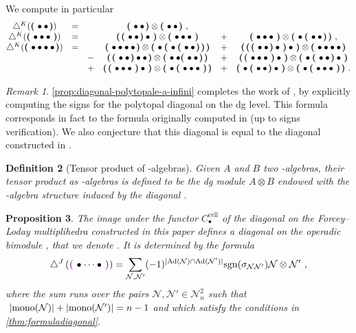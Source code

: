 \documentclass[twoside, 11pt]{amsart}
\newtheorem{definition}{Definition}[section]
\newtheorem{proposition}[definition]{Proposition}
\theoremstyle{remark}
\newtheorem{remark}[definition]{\sc Remark}
\begin{document}
We compute in particular 
\[ \begin{matrix}
\diagainf ( \black { \bullet \bullet } )
&=& & \black{\bullet \bullet} \otimes \black{\bullet \bullet} \ , & & \\
\diagainf ( \black { \bullet \bullet \bullet } ) 
&=& & \black{\black{\bullet \bullet} \bullet} \otimes \black{\bullet \bullet \bullet} &+& \black{\bullet \bullet \bullet} \otimes \black{ \bullet \black{\bullet \bullet}} \ , \\
\diagainf ( \black{ \bullet \bullet \bullet \bullet} ) 
&=& & 
\black{\bullet \bullet \bullet \bullet} \otimes \black{\bullet \black{ \bullet \black{ \bullet \bullet }} }  
&+& \black{ \black{ \black{\bullet \bullet} \bullet } \bullet }  \otimes \black{ \bullet \bullet \bullet \bullet } \\
& & -& \black{ \black{\bullet \bullet } \bullet \bullet } \otimes \black{ \bullet \bullet \black{ \bullet \bullet }}  &+& \black{ \black{ \bullet \bullet \bullet } \bullet }  \otimes \black{ \bullet \black{ \bullet \bullet } \bullet }  \\ 
& & +& \black{ \black{ \bullet \bullet \bullet } \bullet }  \otimes \black{ \bullet \black{ \bullet \bullet \bullet }} &+& \black{ \bullet \black{ \bullet \bullet } \bullet } \otimes \black{ \bullet \black{ \bullet \bullet \bullet }} \ .
\end{matrix} \]

\begin{remark}
\cref{prop:diagonal-polytopale-a-infini} completes the work of \cite{MTTV19}, by explicitly computing the signs for the polytopal diagonal on the dg level. This formula corresponds in fact to the formula originally computed in \cite{MarklShnider06} (up to signs verification). We also conjecture that this diagonal is equal to the diagonal constructed in \cite{SaneblidzeUmble04}.
\end{remark}

\begin{definition}[Tensor product of \Ainf -algebras] \label{def:tensor-product-ainf-alg}
Given $A$ and $B$ two \Ainf -algebras, their tensor product as \Ainf -algebras is defined to be the dg module $A \otimes B$ endowed with the \Ainf -algebra structure induced by the diagonal \diagainf .
\end{definition}

\begin{proposition}
\label{prop:diagonal-polytopale-m-infini}
The image under the functor $C_\bullet^{\mathrm{cell}}$ of the diagonal on the Forcey--Loday multiplihedra constructed in this paper defines a diagonal on the operadic bimodule \Minf , that we denote \diagminf . It is determined by the formula
\[ \diagminf \left( \purple{\bullet \cdots \bullet} \right) = 
\sum_{
\mathcal{N},\mathcal{N}'} 
(-1)^{|\mathrm{Ad}(\mathcal{N})\cap \mathrm{Ad}(\mathcal{N}')|}
\mathrm{sgn}(\sigma_{\mathcal{N}\mathcal{N}'})
\mathcal{N} \otimes \mathcal{N}' \ ,\]
where the sum runs over the pairs $\mathcal{N},\mathcal{N}' \in \mathcal{N}^2_n$ such that $\ |\mono(\mathcal{N})|+|\mono(\mathcal{N}')|=n-1$ and which satisfy the conditions in \cref{thm:formuladiagonal}.
\end{proposition}
\end{document}
